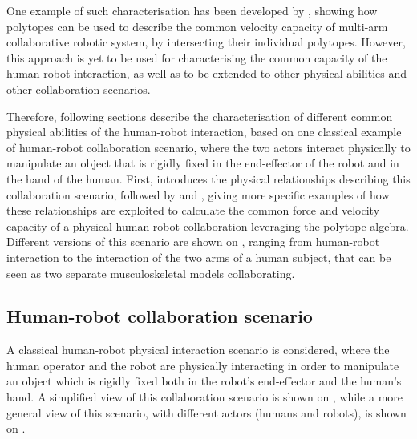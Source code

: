 One example of such characterisation has been developed by \citet{lee2001velocity}, showing how polytopes can be used to describe the common velocity capacity of multi-arm collaborative robotic system, by intersecting their individual polytopes. However, this approach is yet to be used for characterising the common capacity of the human-robot interaction, as well as to be extended to other physical abilities and other collaboration scenarios. 


Therefore, following sections describe the characterisation of different common physical abilities of the human-robot interaction, based on one classical example of human-robot collaboration scenario, where the two actors interact physically to manipulate an object that is rigidly fixed in the end-effector of the robot and in the hand of the human. First,  introduces the physical relationships describing this collaboration scenario, followed by  and , giving more specific examples of how these relationships are exploited to calculate the common force and velocity capacity of a physical human-robot collaboration leveraging the polytope algebra. 
Different versions of this scenario are shown on , ranging from human-robot interaction to the interaction of the two arms of a human subject, that can be seen as two separate musculoskeletal models collaborating.


\subsection{Human-robot collaboration scenario}
\label{ch:which_metric_which}

A classical human-robot physical interaction scenario is considered, where the human operator and the robot are physically interacting in order to manipulate an object which is rigidly fixed both in the robot's end-effector and the human's hand. A simplified view of this collaboration scenario is shown on , while a more general view of this scenario, with different actors (humans and robots), is shown on .

